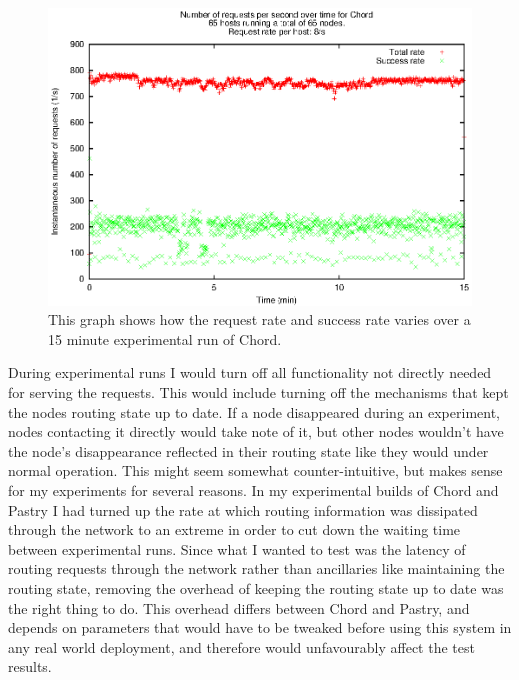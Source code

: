 \begin{figure}[!htbp]
  \begin{center}
    \includegraphics[width=0.9\linewidth]{illustrations/rate_against_time_chord.eps}
    \caption{This graph shows how the request rate and success rate varies over a 15 minute experimental run of Chord.}
    \label{figRateAgainstTime}
  \end{center}
\end{figure}

During experimental runs I would turn off all functionality not directly needed for serving the requests. This would include turning off the mechanisms that kept the nodes routing state up to date. If a node disappeared during an experiment, nodes contacting it directly would take note of it, but other nodes wouldn't have the node's disappearance reflected in their routing state like they would under normal operation. This might seem somewhat counter-intuitive, but makes sense for my experiments for several reasons.
In my experimental builds of Chord and Pastry I had turned up the rate at which routing information was dissipated through the network to an extreme in order to cut down the waiting time between experimental runs. Since what I wanted to test was the latency of routing requests through the network rather than ancillaries like maintaining the routing state, removing the overhead of keeping the routing state up to date was the right thing to do. This overhead differs between Chord and Pastry, and depends on parameters that would have to be tweaked before using this system in any real world deployment, and therefore would unfavourably affect the test results.

\mbox{}

